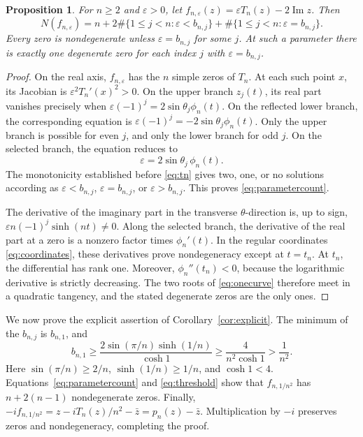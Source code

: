 \documentclass[a4paper]{amsart}
\newtheorem{prop}[thm]{Proposition}
\theoremstyle{remark}
\newcommand{\eps}{\varepsilon}
\DeclareMathOperator{\Ima}{Im}
\begin{document}
\begin{prop}\label{prop:allparameters}
For \(n\ge2\) and \(\eps>0\), let
\(f_{n,\eps}(z)=\eps T_n(z)-2\Ima z\). Then
\begin{equation}\label{eq:parametercount}
 N(f_{n,\eps})=
 n+2\#\{1\le j<n:\eps<b_{n,j}\}
   +\#\{1\le j<n:\eps=b_{n,j}\}.
\end{equation}
Every zero is nondegenerate unless \(\eps=b_{n,j}\) for some \(j\).
At such a parameter there is exactly one degenerate zero for
each index \(j\) with \(\eps=b_{n,j}\).
\end{prop}

\begin{proof}
On the real axis, \(f_{n,\eps}\) has the \(n\) simple zeros of \(T_n\).
At each such point \(x\), its Jacobian is \(\eps^2T_n'(x)^2>0\).
On the upper branch \(z_j(t)\), its real part vanishes precisely when
\(\eps(-1)^j=2\sin\theta_j\phi_n(t)\).
On the reflected lower branch, the corresponding equation is
\(\eps(-1)^j=-2\sin\theta_j\phi_n(t)\).
Only the upper branch is possible for even \(j\), and only the lower
branch for odd \(j\). On the selected branch, the equation reduces to
\begin{equation}\label{eq:onecurve}
 \eps=2\sin\theta_j\,\phi_n(t).
\end{equation}
The monotonicity established before \eqref{eq:tn} gives two, one,
or no solutions according as \(\eps<b_{n,j}\),
\(\eps=b_{n,j}\), or \(\eps>b_{n,j}\). This proves
\eqref{eq:parametercount}.

The derivative of the imaginary part in the transverse
\(\theta\)-direction is, up to sign,
\(\eps n(-1)^j\sinh(nt)\ne0\). Along the selected branch, the
derivative of the real part at a zero is a nonzero factor times
\(\phi_n'(t)\). In the regular coordinates \eqref{eq:coordinates},
these derivatives prove nondegeneracy except at \(t=t_n\).
At \(t_n\), the differential has rank one. Moreover,
\(\phi_n''(t_n)<0\), because the logarithmic derivative is strictly
decreasing. The two roots of \eqref{eq:onecurve} therefore meet in a
quadratic tangency, and the stated degenerate zeros are the only ones.
\end{proof}

We now prove the explicit assertion of Corollary~\ref{cor:explicit}.
The minimum of the \(b_{n,j}\) is \(b_{n,1}\), and
\begin{equation}\label{eq:threshold}
 b_{n,1}\ge
 \frac{2\sin(\pi/n)\sinh(1/n)}{\cosh1}
 \ge \frac{4}{n^2\cosh1}>\frac1{n^2}.
\end{equation}
Here \(\sin(\pi/n)\ge2/n\), \(\sinh(1/n)\ge1/n\), and
\(\cosh1<4\). Equations~\eqref{eq:parametercount} and
\eqref{eq:threshold} show that \(f_{n,1/n^2}\) has \(n+2(n-1)\)
nondegenerate zeros. Finally,
\(-if_{n,1/n^2}=z-iT_n(z)/n^2-\bar z=p_n(z)-\bar z\).
Multiplication by \(-i\) preserves zeros and nondegeneracy, completing
the proof.
\end{document}
